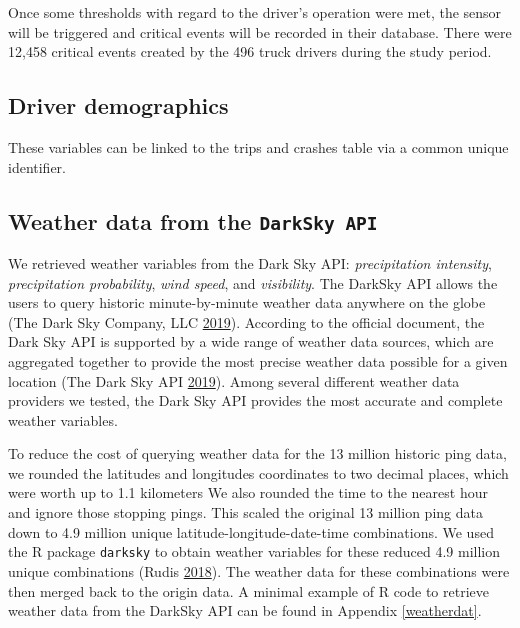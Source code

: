 \documentclass[12pt]{book}
\numberwithin{equation}{chapter}
\begin{document}
Once some thresholds with regard to the driver's operation were met, the sensor will be triggered and critical events will be recorded in their database.
There were 12,458 critical events created by the 496 truck drivers during the study period.

\hypertarget{driver-demographics}{%
\subsection{Driver demographics}\label{driver-demographics}}

These variables can be linked to the trips and crashes table via a common unique identifier.

\hypertarget{weather-data-from-the-darksky-api}{%
\subsection{\texorpdfstring{Weather data from the \texttt{DarkSky\ API}}{Weather data from the DarkSky API}}\label{weather-data-from-the-darksky-api}}

We retrieved weather variables from the Dark Sky API: \emph{precipitation intensity}, \emph{precipitation probability}, \emph{wind speed}, and \emph{visibility}.
The DarkSky API allows the users to query historic minute-by-minute weather data anywhere on the globe (The Dark Sky Company, LLC \protect\hyperlink{ref-darksky}{2019}).
According to the official document, the Dark Sky API is supported by a wide range of weather data sources, which are aggregated together to provide the most precise weather data possible for a given location (The Dark Sky API \protect\hyperlink{ref-darkskyds}{2019}).
Among several different weather data providers we tested, the Dark Sky API provides the most accurate and complete weather variables.

To reduce the cost of querying weather data for the 13 million historic ping data, we rounded the latitudes and longitudes coordinates to two decimal places, which were worth up to 1.1 kilometers
We also rounded the time to the nearest hour and ignore those stopping pings.
This scaled the original 13 million ping data down to 4.9 million unique latitude-longitude-date-time combinations.
We used the R package \texttt{darksky} to obtain weather variables for these reduced 4.9 million unique combinations (Rudis \protect\hyperlink{ref-hrbrmstr}{2018}).
The weather data for these combinations were then merged back to the origin data.
A minimal example of R code to retrieve weather data from the DarkSky API can be found in Appendix \ref{weatherdat}.
\end{document}
